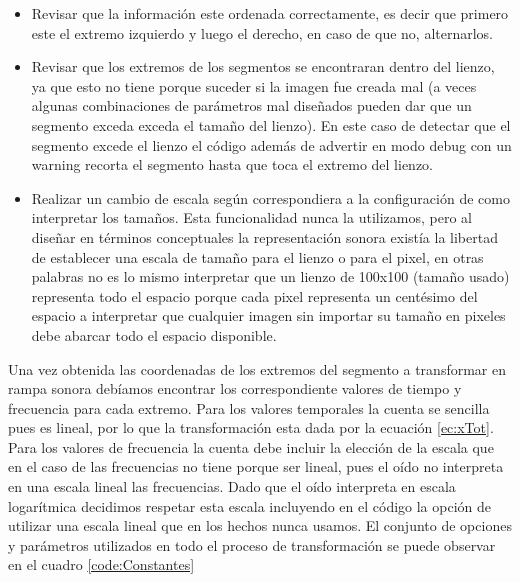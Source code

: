 \documentclass{article}
\begin{document}
    \begin{itemize}
        \item Revisar que la información este ordenada correctamente, es decir que primero este el extremo izquierdo y luego el derecho, en caso de que no, alternarlos. 
        \item Revisar que los extremos de los segmentos se encontraran dentro del lienzo, ya que esto no tiene porque suceder si la imagen fue creada mal (a veces algunas combinaciones de parámetros mal diseñados pueden dar que un segmento exceda exceda el tamaño del lienzo). En este caso de detectar que el segmento excede el lienzo el código además de advertir en modo debug con un warning recorta el segmento hasta que toca el extremo del lienzo.
        \item Realizar un cambio de escala según correspondiera a la configuración de como interpretar los tamaños. Esta funcionalidad nunca la utilizamos, pero al diseñar en términos conceptuales la representación sonora existía la libertad de establecer una escala de tamaño para el lienzo o para el pixel, en otras palabras no es lo mismo interpretar que un lienzo de 100x100 (tamaño usado) representa todo el espacio porque cada pixel representa un centésimo del espacio a interpretar que cualquier imagen sin importar su tamaño en pixeles debe abarcar todo el espacio disponible. 
    \end{itemize}
    
    Una vez obtenida las coordenadas de los extremos del segmento a transformar en rampa sonora debíamos encontrar los correspondiente valores de tiempo y frecuencia para cada extremo. Para los valores temporales la cuenta se sencilla pues es lineal, por lo que la transformación esta dada por la ecuación \ref{ec:xTot}. Para los valores de frecuencia la cuenta debe incluir la elección de la escala que en el caso de las frecuencias no tiene porque ser lineal, pues el oído no interpreta en una escala lineal las frecuencias. Dado que el oído interpreta en escala logarítmica decidimos respetar esta escala incluyendo en el código la opción de utilizar una escala lineal que en los hechos nunca usamos. El conjunto de opciones y parámetros utilizados en todo el proceso de transformación se puede observar en el cuadro \ref{code:Constantes}
\end{document}
